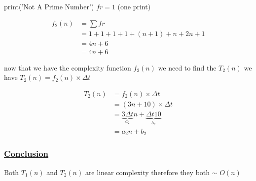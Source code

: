 \vspace{0.15cm}

\textcolor{purplePlot!80!black}{print}(\textcolor{blueArea!60!black}{'Not A Prime Number'}) \hspace{0.9cm} \(fr = 1\) (one print)

\vspace{0.75cm}
\begin{align*}
f_2(n) &= \sum fr \\
     &= 1 + 1 + 1 + 1 + (n+1) + n + 2n + 1 \\
     &= 4n + 6 \\
     &= \boxed{4n + 6}
\end{align*}

\vspace{0.5cm}
now that we have the complexity function \(f_2(n)\) we need to find the \(T_2(n)\)  we have \(T_2(n) = f_2(n) \times \Delta t\)

\begin{align*}
T_2(n) &= f_2(n) \times \Delta t\\ 
&= (3n + 10) \times \Delta t \\
&= \underbrace{3 \Delta t}_{a_2} n + \underbrace{\Delta t 10}_{b_2} \\
&= \boxed{a_2n+b_2} 
\end{align*}

\subsubsection*{\underline{Conclusion}}
Both \(T_1(n)\) and \(T_2(n)\) are linear complexity therefore they both $\sim$ \(O(n)\)

\vspace{1cm}


